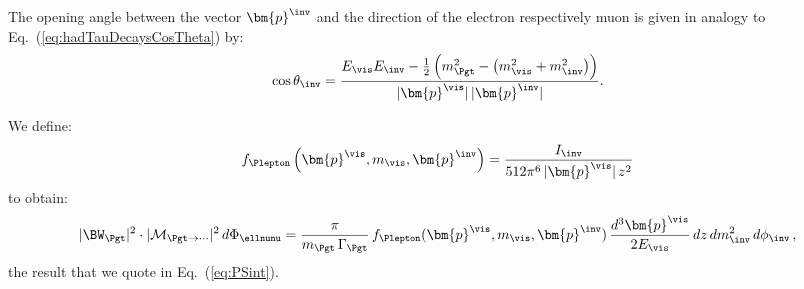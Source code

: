 The opening angle between the vector $\bm{p}^{\inv}$ and the direction
of the electron respectively muon is given in analogy to Eq.~(\ref{eq:hadTauDecaysCosTheta}) by:
\begin{equation}
\cos\theta_{\inv} = \frac{E_{\vis} E_{\inv} - \frac{1}{2} \left(m^{2}_{\Pgt} - \left( m^{2}_{\vis} + m^{2}_{\inv} \right) \right)}{\vert\bm{p}^{\vis}\vert \, 
  \vert\bm{p}^{\inv}\vert}.
\label{eq:lepTauDecaysCosTheta}
\end{equation}

We define:
\begin{equation}
f_{\Plepton}\left(\bm{p}^{\vis}, m_{\vis}, \bm{p}^{\inv}\right) = 
\frac{I_{\inv}}{512\pi^{6} \, \vert\bm{p}^{\vis}\vert \, z^{2}}
\label{eq:lepTauDecays_f}
\end{equation}
to obtain:
\begin{equation}
\vert \BW_{\Pgt} \vert^{2} \cdot \vert\mathcal{M}_{\Pgt\to\cdots}\vert^{2} \,
 d\Phi_{\ellnunu} = \frac{\pi}{m_{\Pgt} \, \Gamma_{\Pgt}} \,
 f_{\Plepton}(\bm{p}^{\vis}, m_{\vis}, \bm{p}^{\inv}) \, \frac{d^{3}\bm{p}^{\vis}}{2 E_{\vis}} \, dz \, dm^{2}_{\inv} \, d\phi_{\inv}
 \, ,
\end{equation}
the result that we quote in Eq.~(\ref{eq:PSint}).
